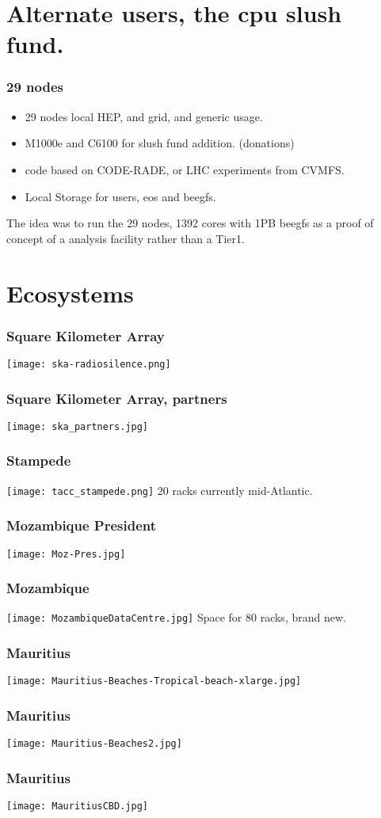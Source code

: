 \documentclass{beamer}
\begin{document}
\section{Alternate users, the cpu slush fund.}

\begin{frame}
\frametitle{29 nodes} %
\begin{itemize}
  \item 29 nodes local HEP, and grid, and generic usage.
  \item M1000e and C6100 for slush fund addition. (donations)
  \item code based on CODE-RADE, or LHC experiments from CVMFS.
  \item Local Storage for users, eos and beegfs.
\end{itemize}
The idea was to run the 29 nodes, 1392 cores with 1PB beegfs as a proof of concept of a analysis facility rather than a Tier1. 
\end{frame}

\section{Ecosystems}
\begin{frame}
    \frametitle{Square Kilometer Array}
    \texttt{[image: ska-radiosilence.png]}
\end{frame}

\begin{frame}
    \frametitle{Square Kilometer Array, partners}
    \texttt{[image: ska\_partners.jpg]}
\end{frame}
\begin{frame}
    \frametitle{Stampede} %
    \texttt{[image: tacc\_stampede.png]}
    20 racks currently mid-Atlantic.
\end{frame}
\begin{frame}
    \frametitle{Mozambique President}
    \texttt{[image: Moz-Pres.jpg]}
\end{frame}
\begin{frame}
    \frametitle{Mozambique}
    \texttt{[image: MozambiqueDataCentre.jpg]}
    Space for 80 racks, brand new.
\end{frame}
\begin{frame}
    \frametitle{Mauritius}
    \texttt{[image: Mauritius-Beaches-Tropical-beach-xlarge.jpg]}
\end{frame}
\begin{frame}
    \frametitle{Mauritius}
    \texttt{[image: Mauritius-Beaches2.jpg]}
\end{frame}
\begin{frame}
    \frametitle{Mauritius}
    \texttt{[image: MauritiusCBD.jpg]}
\end{frame}
\end{document}
